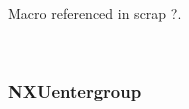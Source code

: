 \documentclass[12pt]{article}
\begin{document}
{\begin{flushleft}
\begin{minipage}{\linewidth}
\begin{list}{}{}
\mbox{}\verb@     }@\\
\mbox{}\verb@     return NX_OK;@\\
\mbox{}\verb@   }@\\
\mbox{}\verb@@$\diamond$
\end{list}
\vspace{-1ex}
\footnotesize\addtolength{\baselineskip}{-1ex}
\begin{list}{}{\setlength{\itemsep}{-\parsep}\setlength{\itemindent}{-\leftmargin}}
\item Macro referenced in scrap ?.
\end{list}
\end{minipage}\\[4ex]
\end{flushleft}
\subsubsection{NXUentergroup}

}
\end{document}
